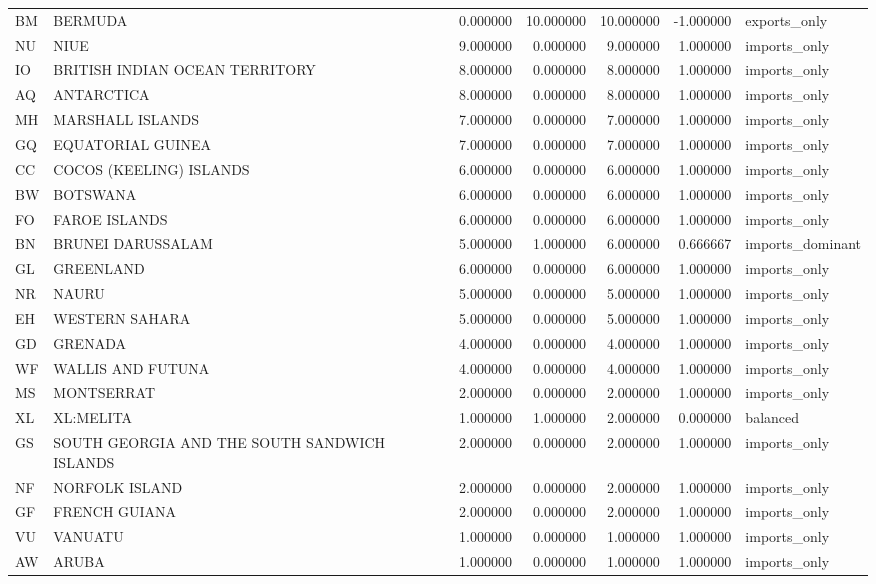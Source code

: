 \begin{tabular}{llrrrrl}
BM & BERMUDA & 0.000000 & 10.000000 & 10.000000 & -1.000000 & exports\_only \\
NU & NIUE & 9.000000 & 0.000000 & 9.000000 & 1.000000 & imports\_only \\
IO & BRITISH INDIAN OCEAN TERRITORY & 8.000000 & 0.000000 & 8.000000 & 1.000000 & imports\_only \\
AQ & ANTARCTICA & 8.000000 & 0.000000 & 8.000000 & 1.000000 & imports\_only \\
MH & MARSHALL ISLANDS & 7.000000 & 0.000000 & 7.000000 & 1.000000 & imports\_only \\
GQ & EQUATORIAL GUINEA & 7.000000 & 0.000000 & 7.000000 & 1.000000 & imports\_only \\
CC & COCOS (KEELING) ISLANDS & 6.000000 & 0.000000 & 6.000000 & 1.000000 & imports\_only \\
BW & BOTSWANA & 6.000000 & 0.000000 & 6.000000 & 1.000000 & imports\_only \\
FO & FAROE ISLANDS & 6.000000 & 0.000000 & 6.000000 & 1.000000 & imports\_only \\
BN & BRUNEI DARUSSALAM & 5.000000 & 1.000000 & 6.000000 & 0.666667 & imports\_dominant \\
GL & GREENLAND & 6.000000 & 0.000000 & 6.000000 & 1.000000 & imports\_only \\
NR & NAURU & 5.000000 & 0.000000 & 5.000000 & 1.000000 & imports\_only \\
EH & WESTERN SAHARA & 5.000000 & 0.000000 & 5.000000 & 1.000000 & imports\_only \\
GD & GRENADA & 4.000000 & 0.000000 & 4.000000 & 1.000000 & imports\_only \\
WF & WALLIS AND FUTUNA & 4.000000 & 0.000000 & 4.000000 & 1.000000 & imports\_only \\
MS & MONTSERRAT & 2.000000 & 0.000000 & 2.000000 & 1.000000 & imports\_only \\
XL & XL:MELITA & 1.000000 & 1.000000 & 2.000000 & 0.000000 & balanced \\
GS & SOUTH GEORGIA AND THE SOUTH SANDWICH ISLANDS & 2.000000 & 0.000000 & 2.000000 & 1.000000 & imports\_only \\
NF & NORFOLK ISLAND & 2.000000 & 0.000000 & 2.000000 & 1.000000 & imports\_only \\
GF & FRENCH GUIANA & 2.000000 & 0.000000 & 2.000000 & 1.000000 & imports\_only \\
VU & VANUATU & 1.000000 & 0.000000 & 1.000000 & 1.000000 & imports\_only \\
AW & ARUBA & 1.000000 & 0.000000 & 1.000000 & 1.000000 & imports\_only \\
\bottomrule
\end{tabular}
